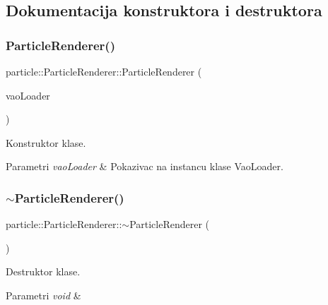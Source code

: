 \subsection{Dokumentacija konstruktora i destruktora}
\mbox{\label{classparticle_1_1ParticleRenderer_a2cb5f823b59a1ffe522fdbdaccfd2b89}} 
\subsubsection{\texorpdfstring{Particle\+Renderer()}{ParticleRenderer()}}
{\footnotesize\ttfamily particle\+::\+Particle\+Renderer\+::\+Particle\+Renderer (\begin{DoxyParamCaption}\item[{\hyperlink{classcore_1_1VaoLoader}{Vao\+Loader} $\ast$}]{vao\+Loader }\end{DoxyParamCaption})}



Konstruktor klase. 


\begin{DoxyParams}{Parametri}
{\em vao\+Loader} & Pokazivac na instancu klase Vao\+Loader. \\
\hline
\end{DoxyParams}
\mbox{\label{classparticle_1_1ParticleRenderer_abefba4a851f58fd2d4c63d4d0a6aae09}} 
\subsubsection{\texorpdfstring{$\sim$\+Particle\+Renderer()}{~ParticleRenderer()}}
{\footnotesize\ttfamily particle\+::\+Particle\+Renderer\+::$\sim$\+Particle\+Renderer (\begin{DoxyParamCaption}{ }\end{DoxyParamCaption})}



Destruktor klase. 


\begin{DoxyParams}{Parametri}
{\em void} & \\
\hline
\end{DoxyParams}


